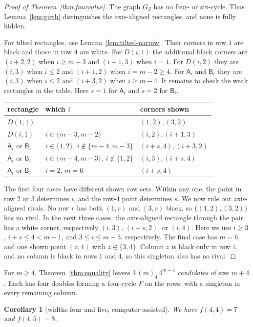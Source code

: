 \documentclass[12pt]{article}
\theoremstyle{plain}
\newtheorem{corollary}[theorem]{Corollary}
\theoremstyle{definition}
\theoremstyle{remark}
\newcommand{\kA}{\mathsf{A}}
\newcommand{\kB}{\mathsf{B}}
\begin{document}
\begin{proof}[Proof of Theorem~\ref{thm:fourvalue}]
The graph $G_S$ has no four- or six-cycle. Thus Lemma~\ref{lem:girth}
distinguishes the axis-aligned rectangles, and none is fully hidden.

For tilted rectangles, use Lemma~\ref{lem:tilted-narrow}.
Their corners in row $1$ are black and those in row $4$ are white.
For $D(i,1)$ the additional black corners are $(i+2,2)$ when $i\ge m-3$
and $(i+1,3)$ when $i=1$. For $D(i,2)$ they are $(i,3)$ when $i\le2$
and $(i+1,2)$ when $i=m-2\ge4$. For $\kA_i$ and $\kB_i$ they are
$(i,3)$ when $i\le2$ and $(i+3,2)$ when $i\ge m-4$.
It remains to check the weak rectangles in the table. Here $s=1$ for $\kA_i$
and $s=2$ for $\kB_i$.
\begin{center}\small
\begin{tabular}{@{}lll@{}}
\toprule
rectangle & which $i$ & corners shown\\
\midrule
$D(1,1)$ & & $(1,2),(3,2)$\\
$D(i,1)$ & $i\in\{m-3,m-2\}$ & $(i,2),(i+1,3)$\\
$\kA_i$ or $\kB_i$ & $i\in\{1,2\}$, $i\notin\{m-4,m-3\}$ & $(i+s,4),(i+3,2)$\\
$\kA_i$ or $\kB_i$ & $i\in\{m-4,m-3\}$, $i\notin\{1,2\}$ & $(i,3),(i+s,4)$\\
$\kA_i$ or $\kB_i$ & $i=2$, $m=6$ & $(i+s,4)$\\
\bottomrule
\end{tabular}
\end{center}
The first four cases have different shown row sets. Within any one,
the point in row $2$ or $3$ determines $i$, and the row-$4$ point
determines $s$.
We now rule out axis-aligned rivals. No row $r$ has
both $(1,r)$ and $(3,r)$ black, so $\{(1,2),(3,2)\}$ has no rival. In the next three cases, the axis-aligned rectangle
through the pair has a white corner, respectively $(i,3)$, $(i+s,2)$,
or $(i,4)$. Here we use $i\ge3$, $i+s\le4<m-1$, and
$3\le i\le m-3$, respectively. The final case has $m=6$ and one
shown point $(z,4)$ with $z\in\{3,4\}$. Column $z$ is black only in
row $1$, and no column is black in rows $1$ and $4$, so this singleton
also has no rival.
\end{proof}

For $m\ge4$, Theorem~\ref{thm:equality} leaves
$3\,(m)_4\,4^{m-4}$ \emph{candidates} of size $m+4$.
Each has four doubles forming a four-cycle $F$ on the rows,
with a singleton in every remaining column.

\begin{corollary}[widths four and five, computer-assisted]\label{cor:fourboundary}
We have $f(4,4)=7$ and $f(4,5)=8$.
\end{corollary}
\end{document}
